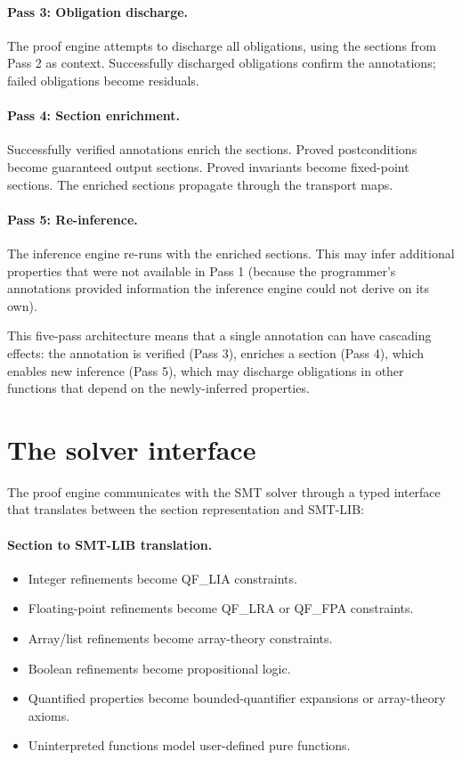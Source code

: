 \documentclass[11pt]{report}
\theoremstyle{definition}
\theoremstyle{plain}
\begin{document}
\paragraph{Pass 3: Obligation discharge.}
The proof engine attempts to discharge all obligations, using the sections
from Pass 2 as context. Successfully discharged obligations confirm the
annotations; failed obligations become residuals.

\paragraph{Pass 4: Section enrichment.}
Successfully verified annotations enrich the sections. Proved postconditions
become guaranteed output sections. Proved invariants become fixed-point
sections. The enriched sections propagate through the transport maps.

\paragraph{Pass 5: Re-inference.}
The inference engine re-runs with the enriched sections. This may infer
additional properties that were not available in Pass 1 (because the
programmer's annotations provided information the inference engine could not
derive on its own).

This five-pass architecture means that a single annotation can have cascading
effects: the annotation is verified (Pass 3), enriches a section (Pass 4),
which enables new inference (Pass 5), which may discharge obligations in other
functions that depend on the newly-inferred properties.

\section{The solver interface}

The proof engine communicates with the SMT solver through a typed interface
that translates between the section representation and SMT-LIB:

\paragraph{Section to SMT-LIB translation.}
\begin{itemize}[nosep]
  \item Integer refinements become QF\_LIA constraints.
  \item Floating-point refinements become QF\_LRA or QF\_FPA constraints.
  \item Array/list refinements become array-theory constraints.
  \item Boolean refinements become propositional logic.
  \item Quantified properties become bounded-quantifier expansions or
        array-theory axioms.
  \item Uninterpreted functions model user-defined pure functions.
\end{itemize}
\end{document}
